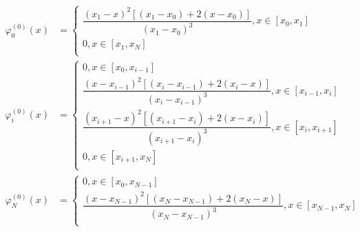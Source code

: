 \documentclass[fleqn, bachelor,subf,12pt,notitlepage]{article}
\begin{document}
\begin{equation}
\begin{aligned}
\varphi^{(0)}_{0}\left(x\right)&=\begin{cases}
\dfrac{\left(x_{1}-x\right)^{2}\left[\left(x_{1}-x_{0}\right)+2\left(x-x_{0}\right)\right]}{\left(x_{1}-x_{0}\right)^{3}},  x\in \left[x_{0}, x_{1}\right]\\
0, x\in \left[x_{1}, x_{N}\right]\\
\end{cases}\\
\varphi^{(0)}_{i}\left(x\right)&=\begin{cases}
0, x\in \left[x_{0}, x_{i-1}\right]\\
\dfrac{\left(x-x_{i-1}\right)^{2}\left[\left(x_{i}-x_{i-1}\right)+2\left(x_{i}-x\right)\right]}{\left(x_{i}-x_{i-1}\right)^{3}}, x\in \left[x_{i-1}, x_{i}\right]\\
\dfrac{\left(x_{i+1}-x\right)^{2}\left[\left(x_{i+1}-x_{i}\right)+2\left(x-x_{i}\right)\right]}{\left(x_{i+1}-x_{i}\right)^{3}}, x\in \left[x_{i}, x_{i+1}\right]\\
0, x\in \left[x_{i+1}, x_{N}\right]\\
\end{cases}\\
\varphi^{(0)}_{N}\left(x\right)&=\begin{cases}
0, x\in \left[x_{0}, x_{N-1}\right]\\
\dfrac{\left(x-x_{N-1}\right)^{2}\left[\left(x_{N}-x_{N-1}\right)+2\left(x_{N}-x\right)\right]}{\left(x_{N}-x_{N-1}\right)^{3}}, x\in \left[x_{N-1}, x_{N}\right]\\
\end{cases}
\end{aligned}
\end{equation}
\end{document}
